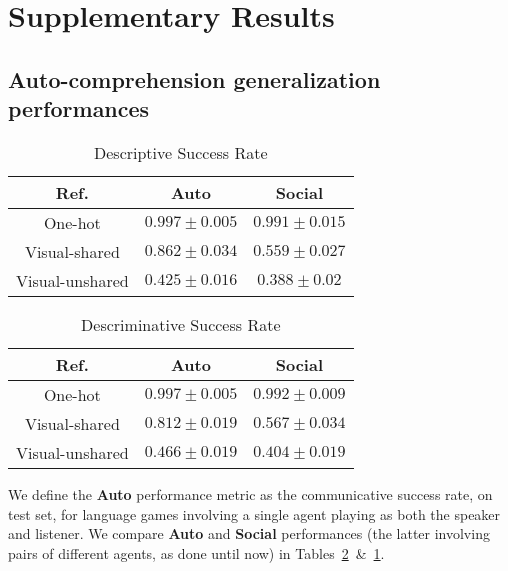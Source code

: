 \newpage
\section{Supplementary Results}

\subsection{Auto-comprehension generalization performances}
\label{sup:auto_social_perf}

\def\arraystretch{1.5}
\begin{table}[!h]
\centering
    \begin{tabular}{|c|c|c|}
     \hline
     \textbf{Ref.} & \textbf{Auto} & \textbf{Social}\\
     \hline
     One-hot & $0.997 \pm 0.005$ & $0.991 \pm 0.015$ \\
     Visual-shared & $0.862 \pm 0.034$ & $0.559 \pm 0.027$  \\
     Visual-unshared & $0.425 \pm 0.016$ & $0.388 \pm 0.02$  \\
     \hline
    \end{tabular}
    \caption{Descriptive Success Rate}
    \label{tab:disc_auto_social}
\end{table}

\def\arraystretch{1.5}
\begin{table}[!h]
\centering
    \begin{tabular}{|c|c|c|}
     \hline
     \textbf{Ref.} & \textbf{Auto} & \textbf{Social}\\
     \hline
     One-hot & $0.997 \pm 0.005$ & $0.992 \pm 0.009$ \\
     Visual-shared & $0.812 \pm 0.019$ & $0.567 \pm 0.034$  \\
     Visual-unshared & $0.466 \pm 0.019$ & $0.404 \pm 0.019$  \\
     \hline
     
    \end{tabular}
    \caption{Descriminative Success Rate}
    \label{tab:desc_auto_social}
\end{table}

We define the \textbf{Auto} performance metric as the communicative success rate, on test set, for language games involving a single agent playing as both the speaker and listener. We compare \textbf{Auto} and \textbf{Social} performances (the latter involving pairs of different agents, as done until now) in Tables~\ref{tab:desc_auto_social}~\&~\ref{tab:disc_auto_social}.



